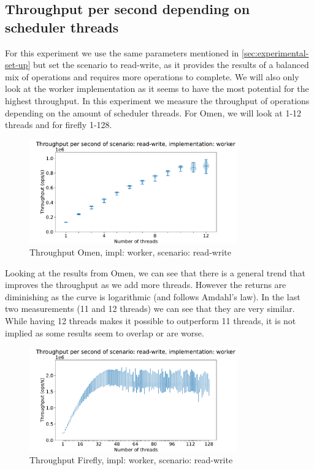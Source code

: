 \documentclass{article}
\begin{document}
\subsection{Throughput per second depending on scheduler threads}
\label{sec:throughput-per-second-depending-on-scheduler-threads}
For this experiment we use the same parameters mentioned in
\autoref{sec:experimental-set-up} but set the scenario to read-write, as it
provides the results of a balanced mix of operations and requires more
operations to complete. We will also only look at the worker implementation as
it seems to have the most potential for the highest throughput. In this experiment we measure the throughput of
operations depending on the amount of scheduler threads. For Omen, we will look
at 1-12 threads and for firefly 1-128.
\begin{figure}[H]
	\centering
	\includegraphics[width=0.8\textwidth]{violinplots/omen/throughput-per-second-of-scenario-read-write-implementation-worker-violinplot.pdf}
	\caption{Throughput Omen, impl: worker, scenario: read-write}
	\label{fig:throughput-omen-read-write-depend-threads}
\end{figure}
Looking at the results from Omen, we can see that there is a general trend that
improves the throughput as we add more threads. However the returns are
diminishing as the curve is logarithmic (and follows Amdahl's law). In the last two measurements (11 and 12
threads) we can see that they are very similar. While having 12 threads makes it
possible to outperform 11 threads, it is not implied as some results seem to
overlap or are worse.
\begin{figure}[H]
	\centering
	\includegraphics[width=0.8\textwidth]{violinplots/firefly/throughput-per-second-of-scenario-read-write-implementation-worker-violinplot.pdf}
	\caption{Throughput Firefly, impl: worker, scenario: read-write}
	\label{fig:throughput-firefly-read-write-depend-threads}
\end{figure}
\end{document}
